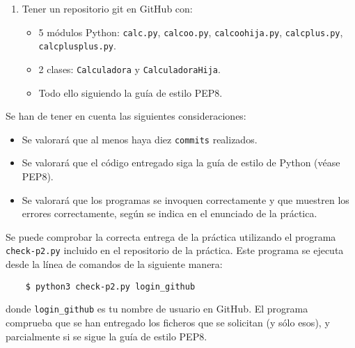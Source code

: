 \documentclass[11pt,a4paper]{article}
\begin{document}
\begin{enumerate}
  \item Tener un repositorio git en GitHub con:
  \begin{itemize}
      \item 5 módulos Python: \texttt{calc.py}, \texttt{calcoo.py}, \texttt{calcoohija.py}, \texttt{calcplus.py}, \texttt{calcplusplus.py}.
      \item 2 clases: \texttt{Calculadora} y \texttt{CalculadoraHija}.
      \item Todo ello siguiendo la guía de estilo PEP8.
  \end{itemize}
\end{enumerate}


Se han de tener en cuenta las siguientes consideraciones:
\begin{itemize}
  \item Se valorará que al menos haya diez \texttt{commits} realizados.
  \item Se valorará que el código entregado siga la guía de estilo de Python (véase PEP8).
  \item Se valorará que los programas se invoquen correctamente y que muestren los errores correctamente, según se indica en el enunciado de la práctica.
\end{itemize}

Se puede comprobar la correcta entrega de la práctica utilizando el programa \texttt{check-p2.py} incluido en el repositorio de la práctica. Este programa se ejecuta desde la línea de comandos de la siguiente manera:
\begin{verbatim}
	$ python3 check-p2.py login_github
\end{verbatim}

donde \texttt{login\_github} es tu nombre de usuario en GitHub. El programa comprueba que se han entregado los ficheros que se solicitan (y sólo esos), y parcialmente si se sigue la guía de estilo PEP8.
\end{document}
